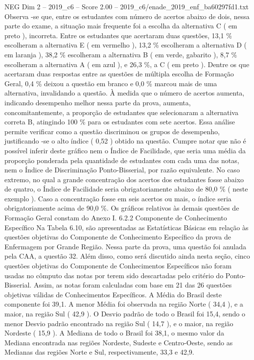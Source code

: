 \begin{textsample}{NEG Dim 2 – 2019\_c6 – Score 2.00 – 2019\_c6/enade\_2019\_enf\_ba60297fd1.txt}
Observa -se que, entre os estudantes com número de acertos abaixo de dois, nessa parte do exame, a situação mais frequente foi a escolha da alternativa C ( em preto ), incorreta.
Entre os estudantes que acertaram duas questões, 13,1 \% escolheram a alternativa E ( em vermelho ), 13,2 \% escolheram a alternativa D ( em laranja ), 38,2 \% escolheram a alternativa B ( em verde, gabarito ), 8,7 \% escolheram a alternativa A ( em azul ), e 26,3 \%, a C ( em preto ).
Dentre os que acertaram duas respostas entre as questões de múltipla escolha de Formação Geral, 0,4 \% deixou a questão em branco e 0,0 \% marcou mais de uma alternativa, invalidando a questão.
À medida que o número de acertos aumenta, indicando desempenho melhor nessa parte da prova, aumenta, concomitantemente, a proporção de estudantes que selecionaram a alternativa correta B, atingindo 100 \% para os estudantes com sete acertos.
Essa análise permite verificar como a questão discriminou os grupos de desempenho, justificando -se o alto índice ( 0,52 ) obtido na questão.
Cumpre notar que não é possível inferir deste gráfico nem o Índice de Facilidade, que seria uma média da proporção ponderada pela quantidade de estudantes com cada uma das notas, nem o Índice de Discriminação Ponto-Bisserial, por razão equivalente.
No caso extremo, no qual a grande concentração dos acertos dos estudantes fosse abaixo de quatro, o Índice de Facilidade seria obrigatoriamente abaixo de 80,0 \% ( neste exemplo ).
Caso a concentração fosse em seis acertos ou mais, o índice seria obrigatoriamente acima de 90,0 \%.
Os gráficos relativos às demais questões de Formação Geral constam do Anexo I. 6.2.2 Componente de Conhecimento Específico Na Tabela 6.10, são apresentadas as Estatísticas Básicas em relação às questões objetivas do Componente de Conhecimento Específico da prova de Enfermagem por Grande Região.
Nessa parte da prova, uma questão foi anulada pela CAA, a questão 32.
Além disso, como será discutido ainda nesta seção, cinco questões objetivas do Componente de Conhecimentos Específicos não foram usadas no cômputo das notas por terem sido descartadas pelo critério do Ponto-Bisserial.
Assim, as notas foram calculadas com base em 21 das 26 questões objetivas válidas de Conhecimentos Específicos.
A Média do Brasil deste componente foi 39,1.
A menor Média foi observada na região Norte ( 34,4 ), e a maior, na região Sul ( 42,9 ).
O Desvio padrão de todo o Brasil foi 15,4, sendo o menor Desvio padrão encontrado na região Sul ( 14,7 ), e o maior, na região Nordeste ( 15,9 ).
A Mediana de todo o Brasil foi 38,1, o mesmo valor da Mediana encontrada nas regiões Nordeste, Sudeste e Centro-Oeste, sendo as Medianas das regiões Norte e Sul, respectivamente, 33,3 e 42,9.

\end{textsample}
